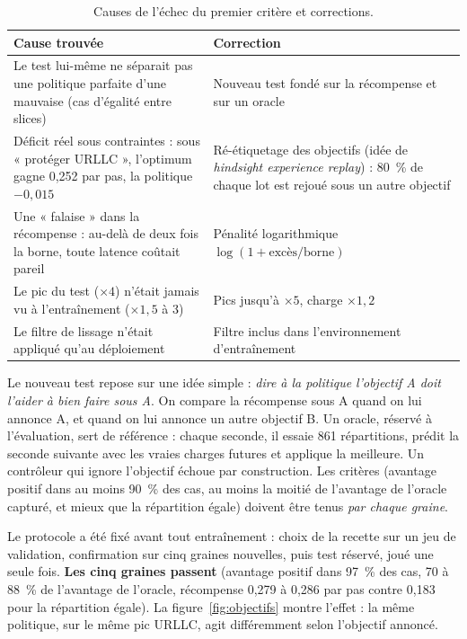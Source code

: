 \documentclass[11pt,a4paper]{article}
\begin{document}
\begin{table}[!htb]
\centering\small
\begin{tabularx}{\textwidth}{@{}P{5.3cm}L@{}}
\toprule
Cause trouvée & Correction\\
\midrule
Le test lui-même ne séparait pas une politique parfaite d'une mauvaise (cas d'égalité entre slices) & Nouveau test fondé sur la récompense et sur un oracle\\
Déficit réel sous contraintes : sous « protéger URLLC », l'optimum gagne 0,252 par pas, la politique $-0{,}015$ & Ré-étiquetage des objectifs (idée de \emph{hindsight experience replay}) : 80~\% de chaque lot est rejoué sous un autre objectif\\
Une « falaise » dans la récompense : au-delà de deux fois la borne, toute latence coûtait pareil & Pénalité logarithmique $\log(1 + \text{excès}/\text{borne})$\\
Le pic du test ($\times 4$) n'était jamais vu à l'entraînement ($\times 1{,}5$ à 3) & Pics jusqu'à $\times 5$, charge $\times 1{,}2$\\
Le filtre de lissage n'était appliqué qu'au déploiement & Filtre inclus dans l'environnement d'entraînement\\
\bottomrule
\end{tabularx}
\caption{Causes de l'échec du premier critère et corrections.}
\label{tab:causes}
\end{table}

Le nouveau test repose sur une idée simple : \emph{dire à la politique l'objectif A doit l'aider à
bien faire sous A}. On compare la récompense sous A quand on lui annonce A, et quand on lui
annonce un autre objectif B. Un oracle, réservé à l'évaluation, sert de référence : chaque seconde,
il essaie 861 répartitions, prédit la seconde suivante avec les vraies charges futures et applique
la meilleure. Un contrôleur qui ignore l'objectif échoue par construction. Les critères
(avantage positif dans au moins 90~\% des cas, au moins la moitié de l'avantage de l'oracle
capturé, et mieux que la répartition égale) doivent être tenus \emph{par chaque graine}.

Le protocole a été fixé avant tout entraînement : choix de la recette sur un jeu de validation,
confirmation sur cinq graines nouvelles, puis test réservé, joué une seule fois.
\textbf{Les cinq graines passent} (avantage positif dans 97~\% des cas, 70 à 88~\% de l'avantage
de l'oracle, récompense 0,279 à 0,286 par pas contre 0,183 pour la répartition égale). La
figure~\ref{fig:objectifs} montre l'effet : la même politique, sur le même pic URLLC, agit
différemment selon l'objectif annoncé.
\end{document}
